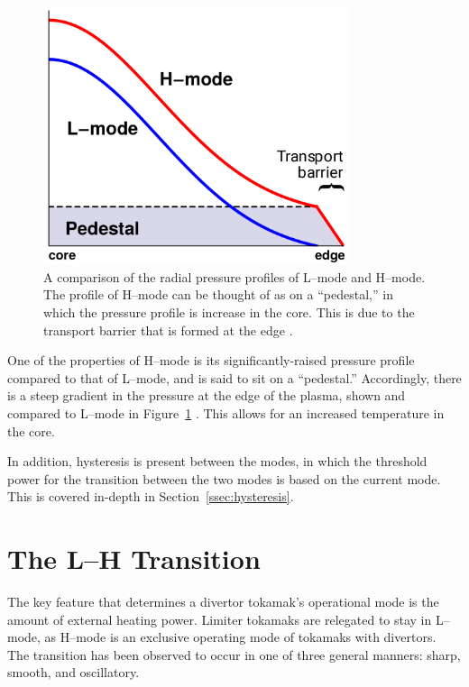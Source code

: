 \begin{figure}[tb] %
\begin{minipage}{0.49\linewidth}
	\centering
	\includegraphics[width=0.8\textwidth]{../Graphics/L-mode_H-mode_compare.png}
\end{minipage}
\hfill
\begin{minipage}{0.49\linewidth}
	\caption{A comparison of the radial pressure profiles of L--mode and H--mode.
	The profile of H--mode can be thought of as on a ``pedestal,'' in which the pressure profile is increase in the core.
	This is due to the transport barrier that is formed at the edge \cite{weymiens_bifurcation_2014}.}
	\label{fig:L-mode_H-mode_compare}
\end{minipage}
\end{figure}

One of the properties of H--mode is its significantly-raised pressure profile compared to that of L--mode, and is said to sit on a ``pedestal.''
Accordingly, there is a steep gradient in the pressure at the edge of the plasma, shown and compared to L--mode in Figure~\ref{fig:L-mode_H-mode_compare} \cite{weymiens_bifurcation_2014}.
This allows for an increased temperature in the core.

In addition, hysteresis is present between the modes, in which the threshold power for the transition between the two modes is based on the current mode.
This is covered in-depth in Section~\ref{ssec:hysteresis}.

\section{The L--H Transition}\label{sec:the_transition}
The key feature that determines a divertor tokamak's operational mode is the amount of external heating power.
Limiter tokamaks are relegated to stay in L--mode, as H--mode is an exclusive operating mode of tokamaks with divertors.
The transition has been observed to occur in one of three general manners: sharp, smooth, and oscillatory.

